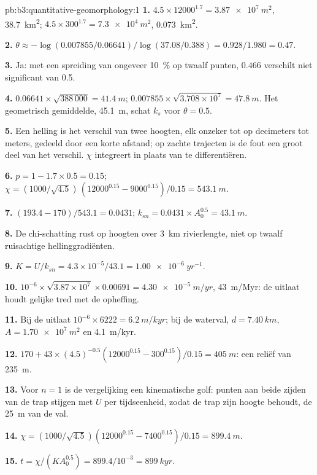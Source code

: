 \begin{solution}{pb:b3:quantitative-geomorphology:1}
\textbf{1.} $4.5\times12000^{1.7} = \qty{3.87e7}{m^2}$, \qty{38.7}{km^2};
$4.5\times300^{1.7} = \qty{7.3e4}{m^2}$, \qty{0.073}{km^2}.

\textbf{2.} $\theta \approx -\log(0.007855/0.06641)/\log(37.08/0.388) =
0.928/1.980 = 0.47$.

\textbf{3.} Ja: met een spreiding van ongeveer \qty{10}{\percent} op twaalf punten,
$0.466$ verschilt niet significant van 0.5.

\textbf{4.} $0.06641\times\sqrt{388\,000} = \qty{41.4}{m}$;
$0.007855\times\sqrt{3.708\times10^7} = \qty{47.8}{m}$. Het geometrisch gemiddelde,
\qty{45.1}{m}, schat $k_s$ voor $\theta = 0.5$.

\textbf{5.} Een helling is het verschil van twee hoogten, elk onzeker tot op
decimeters tot meters, gedeeld door een korte afstand; op zachte trajecten is de
fout een groot deel van het verschil. $\chi$ integreert in plaats van
te differentiëren.

\textbf{6.} $p = 1 - 1.7\times0.5 = 0.15$; $\chi = (1000/\sqrt{4.5})\,
(12000^{0.15} - 9000^{0.15})/0.15 = \qty{543.1}{m}$.

\textbf{7.} $(193.4 - 170)/543.1 = 0.0431$; $k_{sn} = 0.0431\times A_0^{0.5}
= \qty{43.1}{m}$.

\textbf{8.} De chi-schatting rust op hoogten over \qty{3}{km} rivierlengte,
niet op twaalf ruisachtige hellinggradiënten.

\textbf{9.} $K = U/k_{sn} = 4.3\times10^{-5}/43.1 = \qty{1.00e-6}{yr^{-1}}$.

\textbf{10.} $10^{-6}\times\sqrt{3.87\times10^7}\times0.00691 =
\qty{4.30e-5}{m/yr}$, \qty{43}{m/Myr}: de uitlaat houdt gelijke tred met de
opheffing.

\textbf{11.} Bij de uitlaat $10^{-6}\times6222 = \qty{6.2}{m/kyr}$; bij de
waterval, $d = \qty{7.40}{km}$, $A = \qty{1.70e7}{m^2}$ en
\qty{4.1}{m/kyr}.

\textbf{12.} $170 + 43\times(4.5)^{-0.5}(12000^{0.15} - 300^{0.15})/0.15 =
\qty{405}{m}$: een reliëf van \qty{235}{m}.

\textbf{13.} Voor $n = 1$ is de vergelijking een kinematische golf: punten aan beide
zijden van de trap stijgen met $U$ per tijdseenheid, zodat de trap zijn hoogte behoudt,
de \qty{25}{m} van de val.

\textbf{14.} $\chi = (1000/\sqrt{4.5})(12000^{0.15} - 7400^{0.15})/0.15 =
\qty{899.4}{m}$.

\textbf{15.} $t = \chi/(KA_0^{0.5}) = 899.4/10^{-3} = \qty{899}{kyr}$.


\end{solution}
